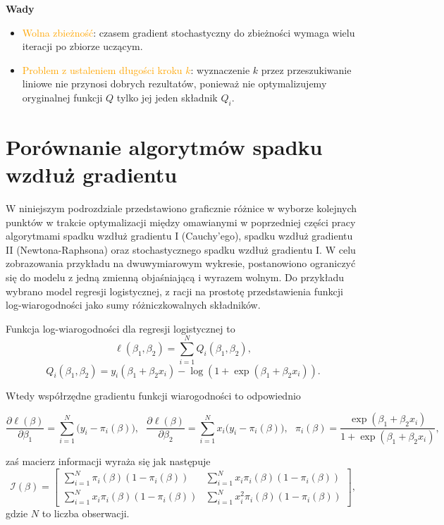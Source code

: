 \textbf{Wady}  \vspace{-5pt}
\begin{itemize}
\item \textcolor{orange}{Wolna zbieżność}: czasem gradient stochastyczny do zbieżności wymaga wielu iteracji po zbiorze uczącym.
\item \textcolor{orange}{Problem z ustaleniem długości kroku $k$}: wyznaczenie $k$
przez przeszukiwanie liniowe nie przynosi dobrych rezultatów,
ponieważ nie optymalizujemy oryginalnej funkcji $Q$ tylko jej jeden
składnik $Q_{i}$.
\end{itemize}
\newpage
\section{Porównanie algorytmów spadku wzdłuż gradientu}

W niniejszym podrozdziale przedstawiono graficznie różnice w wyborze kolejnych punktów w trakcie optymalizacji między omawianymi w poprzedniej części pracy algorytmami spadku wzdłuż gradientu I (Cauchy'ego), spadku wzdłuż gradientu II (Newtona-Raphsona) oraz stochastycznego spadku wzdłuż gradientu I. W celu zobrazowania przykładu na dwuwymiarowym wykresie, postanowiono ograniczyć się do modelu z jedną zmienną objaśniającą i wyrazem wolnym. Do przykładu wybrano model regresji logistycznej, z racji na prostotę przedstawienia funkcji log-wiarogodności jako sumy różniczkowalnych składników.

Funkcja log-wiarogodności dla regresji logistycznej \citep{czepiel, dobson} to
\begin{equation}\label{logglm}
\ell(\beta_1,\beta_2) = \sum\limits_{i=1}^{N} Q_i(\beta_1,\beta_2), 
\end{equation}
\begin{equation}
Q_i(\beta_1,\beta_2) = y_i(\beta_1+\beta_2x_i) -\log(1+\exp(\beta_1+\beta_2x_i)).
\end{equation}

Wtedy współrzędne gradientu funkcji wiarogodności to odpowiednio

\begin{equation*}
\dfrac{\partial\ell(\beta)}{\partial\beta_1} = \sum\limits_{i=1}^{N}\Big(y_i-\pi_i(\beta)\Big), \ \ \
\dfrac{\partial\ell(\beta)}{\partial\beta_2} = \sum\limits_{i=1}^{N}x_i\Big(y_i-\pi_i(\beta)\Big), \ \ \
\pi_i(\beta) = \frac{\exp(\beta_1+\beta_2x_i)}{1+\exp(\beta_1+\beta_2x_i)},
\end{equation*}

zaś macierz informacji wyraża się jak następuje
\begin{equation}\label{iii}
\mathscr{I}(\beta) = 
\begin{bmatrix}
    \sum\limits_{i=1}^{N}\pi_i(\beta)(1-\pi_i(\beta))       & \sum\limits_{i=1}^{N}x_i\pi_i(\beta)(1-\pi_i(\beta)) \\
\sum\limits_{i=1}^{N}x_i\pi_i(\beta)(1-\pi_i(\beta)) & \sum\limits_{i=1}^{N}x_i^2\pi_i(\beta)(1-\pi_i(\beta)) 
\end{bmatrix},
\end{equation}
gdzie $N$ to liczba obserwacji.


